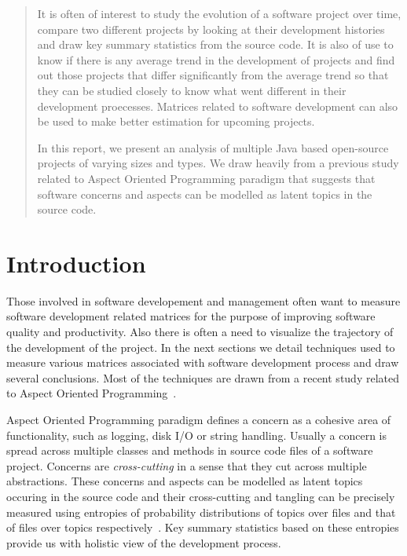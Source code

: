 \documentclass[12pt]{article}
\begin{document}
\maketitle
\begin{abstract}
It is often of interest to study the evolution of a software project over time, compare two different projects by looking at their development histories and draw key summary statistics from the source code. It is also of use to know if there is any average trend in the development of projects and find out those projects that differ significantly from the average trend so that they can be studied closely to know what went different in their development proecesses. Matrices related to software development can also be used to make better estimation for upcoming projects.

In this report, we present an analysis of multiple Java based open-source projects of varying sizes and types. We draw heavily from a previous study related to Aspect Oriented Programming paradigm that suggests that software concerns and aspects can be modelled as latent topics in the source code.
\end{abstract}

\newpage
\section{Introduction}
Those involved in software developement and management often want to measure software development related matrices for the purpose of improving software quality and productivity. Also there is often a need to visualize the trajectory of the development of the project. In the next sections we detail techniques used to measure various matrices associated with software development process and draw several conclusions. Most of the techniques are drawn from a recent study related to Aspect Oriented Programming~\cite{Baldi:2008:TAL:1449955.1449807}.

Aspect Oriented Programming paradigm defines a concern as a cohesive area of functionality, such as logging, disk I/O or string handling. Usually a concern is spread across multiple classes and methods in source code files of a software project. Concerns are \emph{cross-cutting} in a sense that they cut across multiple abstractions. These concerns and aspects can be modelled as latent topics occuring in the source code and their cross-cutting and tangling can be precisely measured using entropies of probability distributions of topics over files and that of files over topics respectively~\cite{Baldi:2008:TAL:1449955.1449807}. Key summary statistics based on these entropies provide us with holistic view of the development process.
\end{document}
